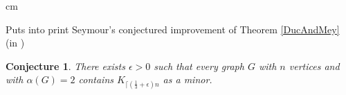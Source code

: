 \documentclass[12 pt]{article}
\newtheorem{conjecture}{Conjecture}
\newcommand{\AG}{$\alpha(G) = 2$\xspace}
\begin{document}
{\linespread{1}
\begin{bibsection}[References]\vspace{-\parskip} %
	\begin{biblist}[\normalsize] %





 cm

Puts into print Seymour's conjectured improvement of Theorem \ref{DucAndMey} (in \cite{DandM})
\begin{conjecture}\label{SeyEps}
	There exists $\epsilon > 0$ such that every graph $G$ with $n$ vertices and with \AG contains $K_{\lceil(\frac{1}{3}+\epsilon)n}$ as a minor.
\end{conjecture}


\end{biblist}
\end{bibsection}}
\end{document}
